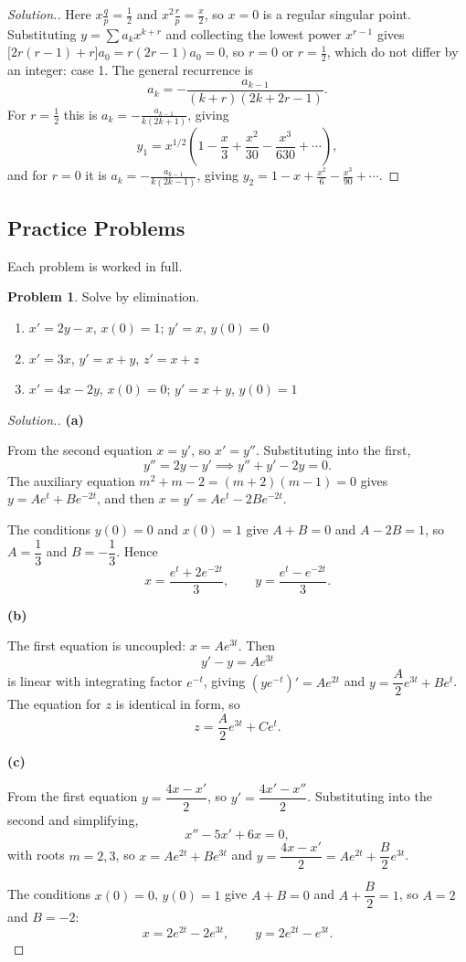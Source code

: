 \documentclass[11pt,a4paper]{article}
\theoremstyle{definition}
\newtheorem{problemx}{Problem}[subsection]
\newenvironment{problem}{\begin{problemx}}{\end{problemx}}
\newenvironment{solution}
  {\renewcommand{\qedsymbol}{}\begin{proof}[\textit{Solution}.]}
  {\end{proof}}
\newcommand{\subhead}[1]{%
  \par\medskip\noindent\textbf{#1}\par\nobreak\smallskip}
\begin{document}
\begin{solution}
Here $x\frac{q}{p} = \frac12$ and $x^2\frac{r}{p} = \frac{x}{2}$, so $x = 0$ is a
regular singular point. Substituting $y = \sum a_kx^{k+r}$ and collecting the
lowest power $x^{r-1}$ gives $\big[2r(r-1) + r\big]a_0 = r(2r - 1)a_0 = 0$, so
$r = 0$ or $r = \frac12$, which do not differ by an integer: case 1. The general
recurrence is
\[a_k = -\frac{a_{k-1}}{(k + r)(2k + 2r - 1)} .\]
For $r = \frac12$ this is $a_k = -\frac{a_{k-1}}{k(2k + 1)}$, giving
\[y_1 = x^{1/2}\left(1 - \frac{x}{3} + \frac{x^2}{30} - \frac{x^3}{630} +
\cdots\right) ,\]
and for $r = 0$ it is $a_k = -\frac{a_{k-1}}{k(2k - 1)}$, giving
$y_2 = 1 - x + \frac{x^2}{6} - \frac{x^3}{90} + \cdots$.
\end{solution}


\subsection{Practice Problems}

Each problem is worked in full.

\begin{problem}
Solve by elimination.
\begin{enumerate}
\item[(a)] $x' = 2y-x$, $x(0)=1$; $y' = x$, $y(0)=0$
\item[(b)] $x' = 3x$, $y' = x+y$, $z' = x+z$
\item[(c)] $x' = 4x-2y$, $x(0)=0$; $y' = x+y$, $y(0)=1$
\end{enumerate}
\end{problem}
\begin{solution}
\subhead{(a)}
From the second equation $x = y'$, so $x' = y''$. Substituting into the first,
\[y'' = 2y - y' \implies y''+y'-2y = 0 .\]
The auxiliary equation $m^2+m-2 = (m+2)(m-1) = 0$ gives
$y = Ae^{t} + Be^{-2t}$, and then $x = y' = Ae^{t} - 2Be^{-2t}$.

The conditions $y(0)=0$ and $x(0)=1$ give $A+B = 0$ and $A-2B = 1$, so
$A = \dfrac13$ and $B = -\dfrac13$. Hence
\[x = \frac{e^{t}+2e^{-2t}}{3},\qquad y = \frac{e^{t}-e^{-2t}}{3}.\]

\subhead{(b)}
The first equation is uncoupled: $x = Ae^{3t}$. Then
\[y'-y = Ae^{3t}\]
is linear with integrating factor $e^{-t}$, giving
$(ye^{-t})' = Ae^{2t}$ and
$y = \dfrac{A}{2}e^{3t} + Be^{t}$. The equation for $z$ is identical in form, so
\[z = \frac{A}{2}e^{3t} + Ce^{t}.\]

\subhead{(c)}
From the first equation $y = \dfrac{4x-x'}{2}$, so
$y' = \dfrac{4x'-x''}{2}$. Substituting into the second and simplifying,
\[x'' - 5x' + 6x = 0 ,\]
with roots $m = 2, 3$, so $x = Ae^{2t}+Be^{3t}$ and
$y = \dfrac{4x-x'}{2} = Ae^{2t} + \dfrac{B}{2}e^{3t}$.

The conditions $x(0)=0$, $y(0)=1$ give $A+B = 0$ and $A+\dfrac{B}{2} = 1$, so
$A = 2$ and $B = -2$:
\[x = 2e^{2t}-2e^{3t},\qquad y = 2e^{2t}-e^{3t}.\]
\end{solution}
\end{document}
